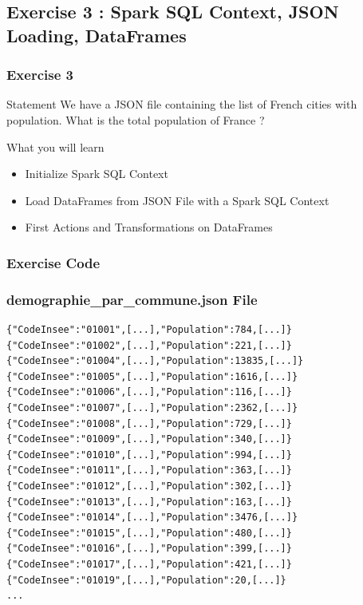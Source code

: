 \documentclass[slidetop,9pt,utf8]{beamer}
\begin{document}
\begin{CJK}{UTF8}{gbsn}
%
%
%
%

\section{Exercise 3 : Spark SQL Context, JSON Loading, DataFrames}

\begin{frame}
  \frametitle{Exercise 3}

  \begin{block}{Statement}
    We have a JSON file containing the list of French cities with population. What is the total population of France ?
  \end{block}

  \begin{block}{What you will learn}
    \begin{itemize}
      \item Initialize Spark SQL Context
      \item Load DataFrames from JSON File with a Spark SQL Context
      \item First Actions and Transformations on DataFrames
    \end{itemize}
  \end{block}

\end{frame}

\begin{frame}
  \frametitle{Exercise Code}

  

\end{frame}

\begin{frame}[fragile]
  \frametitle{demographie\_par\_commune.json File}

  \begin{verbatim}
{"CodeInsee":"01001",[...],"Population":784,[...]}
{"CodeInsee":"01002",[...],"Population":221,[...]}
{"CodeInsee":"01004",[...],"Population":13835,[...]}
{"CodeInsee":"01005",[...],"Population":1616,[...]}
{"CodeInsee":"01006",[...],"Population":116,[...]}
{"CodeInsee":"01007",[...],"Population":2362,[...]}
{"CodeInsee":"01008",[...],"Population":729,[...]}
{"CodeInsee":"01009",[...],"Population":340,[...]}
{"CodeInsee":"01010",[...],"Population":994,[...]}
{"CodeInsee":"01011",[...],"Population":363,[...]}
{"CodeInsee":"01012",[...],"Population":302,[...]}
{"CodeInsee":"01013",[...],"Population":163,[...]}
{"CodeInsee":"01014",[...],"Population":3476,[...]}
{"CodeInsee":"01015",[...],"Population":480,[...]}
{"CodeInsee":"01016",[...],"Population":399,[...]}
{"CodeInsee":"01017",[...],"Population":421,[...]}
{"CodeInsee":"01019",[...],"Population":20,[...]}
...
  \end{verbatim}
\end{frame}


\end{CJK}
\end{document}
